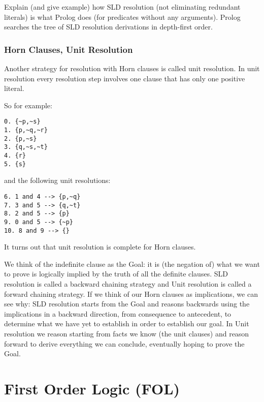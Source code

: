 Explain (and give example) how SLD resolution (not eliminating
redundant literals) is what Prolog does (for predicates without any
arguments).  Prolog searches the tree of SLD resolution derivations in
depth-first order.

\subsubsection{Horn Clauses, Unit Resolution}

Another strategy for resolution with Horn clauses is called unit
resolution.  In unit resolution every resolution step involves one
clause that has only one positive literal.

So for example:
\begin{verbatim}
0. {~p,~s}
1. {p,~q,~r}
2. {p,~s}
3. {q,~s,~t}
4. {r}
5. {s}
\end{verbatim}
and the following unit resolutions:
\begin{verbatim}
6. 1 and 4 --> {p,~q}
7. 3 and 5 --> {q,~t}
8. 2 and 5 --> {p}
9. 0 and 5 --> {~p}
10. 8 and 9 --> {}
\end{verbatim}
It turns out that unit resolution is complete for Horn clauses.  

We think of the indefinite clause as the Goal: it is (the negation of)
what we want to prove is logically implied by the truth of all the
definite clauses.  SLD resolution is called a backward chaining
strategy and Unit resolution is called a forward chaining strategy.
If we think of our Horn clauses as implications, we can see why: SLD
resolution starts from the Goal and reasons backwards using the
implications in a backward direction, from consequence to antecedent,
to determine what we have yet to establish in order to establish our
goal.  In Unit resolution we reason starting from facts we know (the
unit clauses) and reason forward to derive everything we can conclude,
eventually hoping to prove the Goal.

\section{First Order Logic (FOL)}


